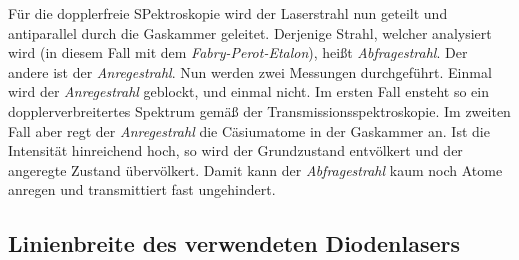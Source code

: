 \documentclass[../bericht.tex]{subfiles}
\begin{document}
        Für die dopplerfreie SPektroskopie wird der Laserstrahl nun geteilt und antiparallel durch die Gaskammer geleitet. Derjenige Strahl, welcher analysiert wird (in diesem Fall mit dem \textit{Fabry-Perot-Etalon}), heißt \textit{Abfragestrahl}. Der andere ist der \textit{Anregestrahl}. Nun werden zwei Messungen durchgeführt. Einmal wird der \textit{Anregestrahl} geblockt, und einmal nicht. Im ersten Fall ensteht so ein dopplerverbreitertes Spektrum gemäß der Transmissionsspektroskopie. Im zweiten Fall aber regt der \textit{Anregestrahl} die Cäsiumatome in der Gaskammer an. Ist die Intensität hinreichend hoch, so wird der Grundzustand entvölkert und der angeregte Zustand übervölkert. Damit kann der \textit{Abfragestrahl} kaum noch Atome anregen und transmittiert fast ungehindert.


      \subsection{Linienbreite des verwendeten Diodenlasers}
      \label{subsec:linienbreite-laser}
\end{document}
